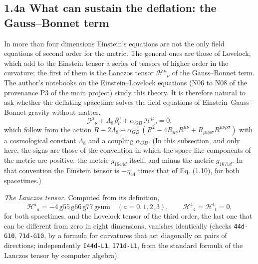 \documentclass[
  10pt,
]{article}
\begin{document}
\hypertarget{a-what-can-sustain-the-deflation-the-gaussbonnet-term}{%
\subsection{1.4a What can sustain the deflation: the Gauss--Bonnet
term}\label{a-what-can-sustain-the-deflation-the-gaussbonnet-term}}

In more than four dimensions Einstein's equations are not the only field
equations of second order for the metric. The general ones are those of
Lovelock, which add to the Einstein tensor a series of tensors of higher
order in the curvature; the first of them is the Lanczos tensor
\(\mathcal H^\mu{}_\nu\) of the Gauss--Bonnet term. The author's
notebooks on the Einstein--Lovelock equations (N06 to N08 of the
provenance P3 of the main project) study this theory. It is therefore
natural to ask whether the deflating spacetime solves the field
equations of Einstein--Gauss--Bonnet gravity without matter,
\[\mathcal G^\mu{}_\nu+\Lambda_8\,\delta^\mu_\nu+\alpha_{GB}\,\mathcal H^\mu{}_\nu=0,\tag{1.10a}\]
which follow from the action
\(R-2\Lambda_8+\alpha_{GB}\,(R^2-4R_{\mu\nu}R^{\mu\nu}+R_{\mu\nu\rho\sigma}R^{\mu\nu\rho\sigma})\)
with a cosmological constant \(\Lambda_8\) and a coupling
\(\alpha_{GB}\). (In this subsection, and only here, the signs are those
of the convention in which the space-like components of the metric are
positive: the metric \(g_{1644d}\) itself, and minus the metric
\(g_{1671d}\). In that convention the Einstein tensor is \(-\eta_{44}\)
times that of Eq. (1.10), for both spacetimes.)

\emph{The Lanczos tensor.} Computed from its definition,
\[\mathcal H^a{}_a=-4\,\mathrm{g55}\,\mathrm{g66}\,\mathrm{g77}\,\mathrm{gsum}\quad(a=0,1,2,3),\qquad
\mathcal H^4{}_4=\mathcal H^t{}_t=0,\tag{1.10b}\] for both spacetimes,
and the Lovelock tensor of the third order, the last one that can be
different from zero in eight dimensions, vanishes identically (checks
\texttt{44d-G10}, \texttt{71d-G10}, by a formula for curvatures that act
diagonally on pairs of directions; independently \texttt{I44d-L1},
\texttt{I71d-L1}, from the standard formula of the Lanczos tensor by
computer algebra).
\end{document}
